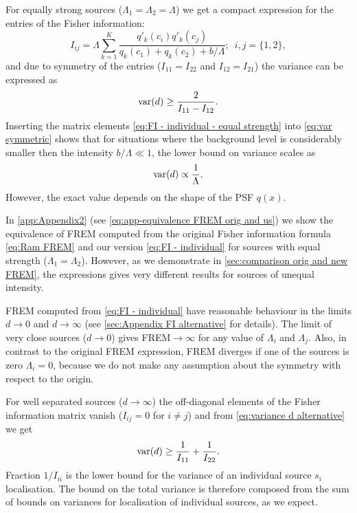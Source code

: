 For equally strong sources ($\Lambda_1=\Lambda_2=\Lambda$) we get a compact expression for the entries of the Fisher information: 
%
\begin{equation}
	I_{ij} =\Lambda\sum_{k=1}^{K}\frac{q'_k(c_i)q'_k(c_j)}{q_k(c_1)+q_k(c_2)+b/\Lambda};\; \ i,j=\{1,2\},
	\label{eq:FI - individual - equal strength}
\end{equation}
%
and due to symmetry of the entries ($I_{11}=I_{22}$ and $I_{12}=I_{21}$) the variance can be expressed as
%
\begin{equation}
	\mathrm{var}(d)\geq\frac{2}{I_{11}-I_{12}}.
	\label{eq:var symmetric}
\end{equation}
%
Inserting the matrix elements \autoref{eq:FI - individual - equal strength} into \autoref{eq:var symmetric} shows that for situations where the background level is considerably smaller then the intensity $b/\Lambda\ll1$, the lower bound on variance scales as
%
\begin{equation}
	\mathrm{var}(d)\propto\frac{1}{\Lambda}. 
\end{equation}
%
However, the exact value depends on the shape of the PSF $q(x)$.

In \autoref{app:Appendix2} (see \autoref{eq:app-equivalence FREM orig and us}) we show the equivalence of FREM computed from the original Fisher information formula \autoref{eq:Ram FREM} and our version \autoref{eq:FI - individual} for sources with equal strength ($\Lambda_1=\Lambda_2$). However, as we demonstrate in \autoref{sec:comparison orig and new FREM}, the expressions gives very different results for sources of unequal intensity. 

FREM computed from \autoref{eq:FI - individual} have reasonable behaviour in the limits $d\rightarrow0$ and $d\rightarrow\infty$ (see \autoref{sec:Appendix FI alternative} for details). The limit of very close sources ($d\rightarrow0$) gives FREM$\rightarrow\infty$ for any value of $\Lambda_i$ and $\Lambda_j$. Also, in contrast to the original FREM expression, FREM diverges if one of the sources is zero $\Lambda_i=0$, because we do not make any assumption about the symmetry with respect to the origin. 

For well separated sources ($d\rightarrow\infty$) the off-diagonal elements of the Fisher information matrix vanish ($I_{ij}=0$ for $i\neq j$) and from \autoref{eq:variance d alternative} we get
%
\begin{equation}
 	\mathrm{var}(d)\geq\frac{1}{I_{11}}+\frac{1}{I_{22}}.
\end{equation}
%
Fraction $1/I_{ii}$ is the lower bound for the variance of an individual source $s_i$ localisation. The bound on the total variance is therefore composed from the sum of bounds on variances for localisation of individual sources, as we expect.


